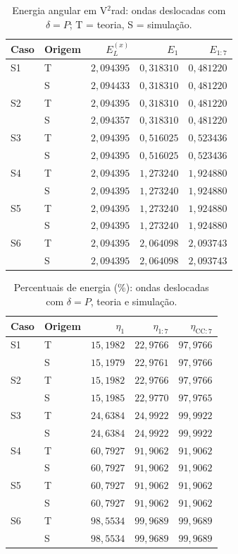 \begin{table}[H]
\centering
\footnotesize\setlength{\tabcolsep}{3.5pt}
\caption{Energia angular em V$^2$rad: ondas deslocadas com $\delta=P$; T = teoria, S = simulação.}\label{tab:energia_abs2}
\begin{tabular}{llrrr}\hline
Caso & Origem & $E_L^{(x)}$ & $E_1$ & $E_{1:7}$ \\ \hline
S1 & T & $2{,}094395$ & $0{,}318310$ & $0{,}481220$ \\
 & S & $2{,}094433$ & $0{,}318310$ & $0{,}481220$ \\
S2 & T & $2{,}094395$ & $0{,}318310$ & $0{,}481220$ \\
 & S & $2{,}094357$ & $0{,}318310$ & $0{,}481220$ \\
S3 & T & $2{,}094395$ & $0{,}516025$ & $0{,}523436$ \\
 & S & $2{,}094395$ & $0{,}516025$ & $0{,}523436$ \\
S4 & T & $2{,}094395$ & $1{,}273240$ & $1{,}924880$ \\
 & S & $2{,}094395$ & $1{,}273240$ & $1{,}924880$ \\
S5 & T & $2{,}094395$ & $1{,}273240$ & $1{,}924880$ \\
 & S & $2{,}094395$ & $1{,}273240$ & $1{,}924880$ \\
S6 & T & $2{,}094395$ & $2{,}064098$ & $2{,}093743$ \\
 & S & $2{,}094395$ & $2{,}064098$ & $2{,}093743$ \\
\hline\end{tabular}
\end{table}
\begin{table}[H]
\centering
\footnotesize\setlength{\tabcolsep}{3.5pt}
\caption{Percentuais de energia (\%): ondas deslocadas com $\delta=P$, teoria e simulação.}\label{tab:energias_P}
\begin{tabular}{llrrr}\hline
Caso & Origem & $\eta_1$ & $\eta_{1:7}$ & $\eta_{\mathrm{CC}:7}$ \\ \hline
S1 & T & $15{,}1982$ & $22{,}9766$ & $97{,}9766$ \\
 & S & $15{,}1979$ & $22{,}9761$ & $97{,}9766$ \\
S2 & T & $15{,}1982$ & $22{,}9766$ & $97{,}9766$ \\
 & S & $15{,}1985$ & $22{,}9770$ & $97{,}9765$ \\
S3 & T & $24{,}6384$ & $24{,}9922$ & $99{,}9922$ \\
 & S & $24{,}6384$ & $24{,}9922$ & $99{,}9922$ \\
S4 & T & $60{,}7927$ & $91{,}9062$ & $91{,}9062$ \\
 & S & $60{,}7927$ & $91{,}9062$ & $91{,}9062$ \\
S5 & T & $60{,}7927$ & $91{,}9062$ & $91{,}9062$ \\
 & S & $60{,}7927$ & $91{,}9062$ & $91{,}9062$ \\
S6 & T & $98{,}5534$ & $99{,}9689$ & $99{,}9689$ \\
 & S & $98{,}5534$ & $99{,}9689$ & $99{,}9689$ \\
\hline\end{tabular}
\end{table}
